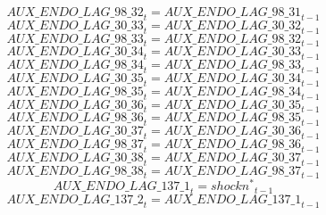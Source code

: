 \begin{dmath}
{AUX\_ENDO\_LAG\_98\_32}_{t}={AUX\_ENDO\_LAG\_98\_31}_{t-1}
\end{dmath}
\begin{dmath}
{AUX\_ENDO\_LAG\_30\_33}_{t}={AUX\_ENDO\_LAG\_30\_32}_{t-1}
\end{dmath}
\begin{dmath}
{AUX\_ENDO\_LAG\_98\_33}_{t}={AUX\_ENDO\_LAG\_98\_32}_{t-1}
\end{dmath}
\begin{dmath}
{AUX\_ENDO\_LAG\_30\_34}_{t}={AUX\_ENDO\_LAG\_30\_33}_{t-1}
\end{dmath}
\begin{dmath}
{AUX\_ENDO\_LAG\_98\_34}_{t}={AUX\_ENDO\_LAG\_98\_33}_{t-1}
\end{dmath}
\begin{dmath}
{AUX\_ENDO\_LAG\_30\_35}_{t}={AUX\_ENDO\_LAG\_30\_34}_{t-1}
\end{dmath}
\begin{dmath}
{AUX\_ENDO\_LAG\_98\_35}_{t}={AUX\_ENDO\_LAG\_98\_34}_{t-1}
\end{dmath}
\begin{dmath}
{AUX\_ENDO\_LAG\_30\_36}_{t}={AUX\_ENDO\_LAG\_30\_35}_{t-1}
\end{dmath}
\begin{dmath}
{AUX\_ENDO\_LAG\_98\_36}_{t}={AUX\_ENDO\_LAG\_98\_35}_{t-1}
\end{dmath}
\begin{dmath}
{AUX\_ENDO\_LAG\_30\_37}_{t}={AUX\_ENDO\_LAG\_30\_36}_{t-1}
\end{dmath}
\begin{dmath}
{AUX\_ENDO\_LAG\_98\_37}_{t}={AUX\_ENDO\_LAG\_98\_36}_{t-1}
\end{dmath}
\begin{dmath}
{AUX\_ENDO\_LAG\_30\_38}_{t}={AUX\_ENDO\_LAG\_30\_37}_{t-1}
\end{dmath}
\begin{dmath}
{AUX\_ENDO\_LAG\_98\_38}_{t}={AUX\_ENDO\_LAG\_98\_37}_{t-1}
\end{dmath}
\begin{dmath}
{AUX\_ENDO\_LAG\_137\_1}_{t}={{shockn^*}}_{t-1}
\end{dmath}
\begin{dmath}
{AUX\_ENDO\_LAG\_137\_2}_{t}={AUX\_ENDO\_LAG\_137\_1}_{t-1}
\end{dmath}
